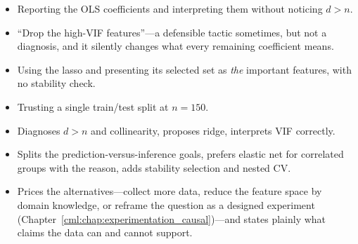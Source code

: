 \begin{interviewq}
\redflags
\begin{itemize}
    \item Reporting the OLS coefficients and interpreting them without noticing $d>n$.
    \item ``Drop the high-VIF features''---a defensible tactic sometimes, but not a diagnosis, and it silently changes what every remaining coefficient means.
    \item Using the lasso and presenting its selected set as \emph{the} important features, with no stability check.
    \item Trusting a single train/test split at $n=150$.
\end{itemize}


\goodgreat
\begin{itemize}
    \item {} Diagnoses $d>n$ and collinearity, proposes ridge, interprets VIF correctly.
    \item {} Splits the prediction-versus-inference goals, prefers elastic net for correlated groups with the reason, adds stability selection and nested CV.
    \item {} Prices the alternatives---collect more data, reduce the feature space by domain knowledge, or reframe the question as a designed experiment (Chapter~\ref{cml:chap:experimentation_causal})---and states plainly what claims the data can and cannot support.
\end{itemize}

\end{interviewq}

